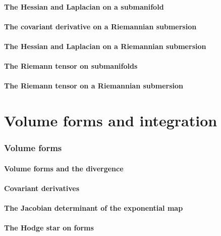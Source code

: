 \documentclass[a4paper]{article}
\begin{document}
\subsection{The Hessian and Laplacian on a submanifold}

\subsection{The covariant derivative on a Riemannian submersion}

\subsection{The Hessian and Laplacian on a Riemannian submersion}

\subsection{The Riemann tensor on submanifolds}

\subsection{The Riemann tensor on a Riemannian submersion}

\part{Volume forms and integration}

\section{Volume forms}

\subsection{Volume forms and the divergence}

\subsection{Covariant derivatives}

\subsection{The Jacobian determinant of the exponential map}

\subsection{The Hodge star on forms}
\end{document}
